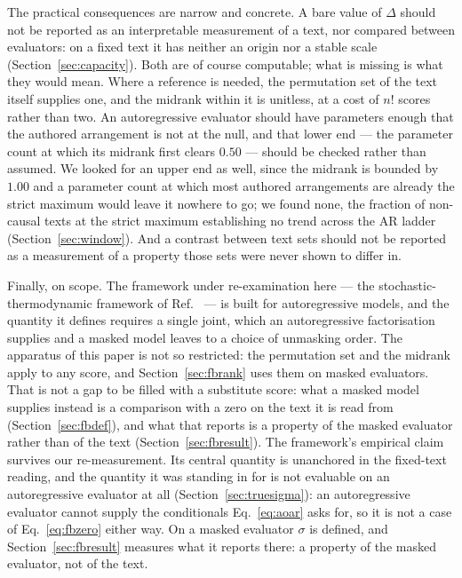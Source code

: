 \documentclass[11pt]{article}
\begin{document}
The practical consequences are narrow and concrete.  A bare value of
$\Delta$ should not be reported as an interpretable measurement of a text,
nor compared between evaluators: on a fixed text it has neither an origin
nor a stable scale (Section~\ref{sec:capacity}).  Both are of course
computable; what is missing is what they would mean.  Where a reference is
needed, the permutation set of the text itself supplies one, and the midrank
within it is unitless, at a cost of $n!$ scores rather than two.  An
autoregressive evaluator should have parameters enough that the authored
arrangement is not at the null, and that lower end --- the parameter count at
which its midrank first clears $0.50$ --- should be checked rather than
assumed.  We looked for an upper end as well, since the midrank is bounded
by $1.00$ and a parameter count at which most authored arrangements are
already the strict maximum would leave it nowhere to go; we found none, the
fraction of non-causal texts at the strict maximum establishing no trend
across the AR ladder (Section~\ref{sec:window}).  And a contrast between text sets should not
be reported as a measurement of a property those sets were never shown to
differ in.

Finally, on scope.  The framework under re-examination here --- the
stochastic-thermodynamic framework of Ref.~\cite{sagawa2026} --- is built
for autoregressive models, and the quantity it defines requires a single
joint, which an autoregressive factorisation supplies and a masked model
leaves to a choice of unmasking order.  The apparatus of this paper is not
so restricted: the permutation set and the midrank apply to any score, and
Section~\ref{sec:fbrank} uses them on masked evaluators.  That is not a gap
to be filled with a substitute score: what a masked model supplies instead is
a comparison with a zero on the text it is read from
(Section~\ref{sec:fbdef}), and what that reports is a property of the masked
evaluator rather than of the text (Section~\ref{sec:fbresult}).  The
framework's empirical claim survives our re-measurement.  Its central
quantity is unanchored in the fixed-text reading, and the quantity it was
standing in for is not evaluable on an autoregressive evaluator at all
(Section~\ref{sec:truesigma}): an autoregressive evaluator cannot supply
the conditionals Eq.~\eqref{eq:aoar} asks for, so it is not a case of
Eq.~\eqref{eq:fbzero} either way.  On a masked evaluator $\sigma$ is
defined, and Section~\ref{sec:fbresult} measures what it reports there: a
property of the masked evaluator, not of the text.
\end{document}
